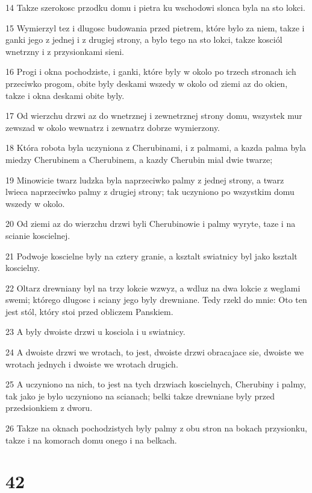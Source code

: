\par 14 Takze szerokosc przodku domu i pietra ku wschodowi slonca byla na sto lokci.
\par 15 Wymierzyl tez i dlugosc budowania przed pietrem, które bylo za niem, takze i ganki jego z jednej i z drugiej strony, a bylo tego na sto lokci, takze kosciól wnetrzny i z przysionkami sieni.
\par 16 Progi i okna pochodziste, i ganki, które byly w okolo po trzech stronach ich przeciwko progom, obite byly deskami wszedy w okolo od ziemi az do okien, takze i okna deskami obite byly.
\par 17 Od wierzchu drzwi az do wnetrznej i zewnetrznej strony domu, wszystek mur zewszad w okolo wewnatrz i zewnatrz dobrze wymierzony.
\par 18 Która robota byla uczyniona z Cherubinami, i z palmami, a kazda palma byla miedzy Cherubinem a Cherubinem, a kazdy Cherubin mial dwie twarze;
\par 19 Minowicie twarz ludzka byla naprzeciwko palmy z jednej strony, a twarz lwieca naprzeciwko palmy z drugiej strony; tak uczyniono po wszystkim domu wszedy w okolo.
\par 20 Od ziemi az do wierzchu drzwi byli Cherubinowie i palmy wyryte, taze i na scianie koscielnej.
\par 21 Podwoje koscielne byly na cztery granie, a ksztalt swiatnicy byl jako ksztalt koscielny.
\par 22 Oltarz drewniany byl na trzy lokcie wzwyz, a wdluz na dwa lokcie z weglami swemi; którego dlugosc i sciany jego byly drewniane. Tedy rzekl do mnie: Oto ten jest stól, który stoi przed obliczem Panskiem.
\par 23 A byly dwoiste drzwi u kosciola i u swiatnicy.
\par 24 A dwoiste drzwi we wrotach, to jest, dwoiste drzwi obracajace sie, dwoiste we wrotach jednych i dwoiste we wrotach drugich.
\par 25 A uczyniono na nich, to jest na tych drzwiach koscielnych, Cherubiny i palmy, tak jako je bylo uczyniono na scianach; belki takze drewniane byly przed przedsionkiem z dworu.
\par 26 Takze na oknach pochodzistych byly palmy z obu stron na bokach przysionku, takze i na komorach domu onego i na belkach.

\chapter{42}

